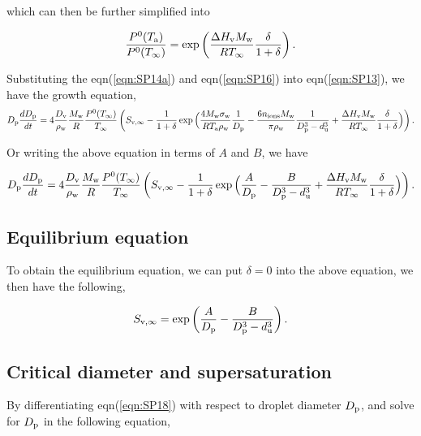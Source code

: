 \documentclass[12pt]{article}
\begin{document}
which can then be further simplified into 

\begin{equation}\label{eqn:SP16}
\frac{P^{\rm 0}(T_{\rm a})}{P^{\rm 0}(T_{\infty})}=\exp \left(\frac{\Delta H_{\rm v} M_{\rm w}}{R T_{\infty}} \frac{\delta}{1+\delta}\right).
\end{equation}

Substituting the eqn(\ref{eqn:SP14a}) and eqn(\ref{eqn:SP16}) into eqn(\ref{eqn:SP13}), we have
the growth equation, 
\begin{equation}\label{eqn:SP17a}
D_{\rm p}\frac{dD_{\rm p}}{dt}=4 \frac{D_{\rm v}} {\rho_{\rm w}} \frac{M_{\rm w}}{R} \frac{P^{\rm 0}(T_{\infty})} {T_{\infty}} \left(S_{\rm v, \infty} - \frac{1}{1+\delta} \exp \Big(\frac{4 M_{\rm w}\sigma_{\rm w}}{R T_{\rm a} \rho_{\rm w}}\frac{1}{D_{\rm p}}-\frac{6 n_{\rm ions} M_{\rm w}}{\pi \rho_{\rm w}} \frac{1}{D_{\rm p}^{3}-d_{\rm u}^{3}}+\frac{\Delta H_{\rm v} M_{\rm w}}{R T_{\infty}} \frac{\delta}{1+\delta}\Big)\right).
\end{equation}

Or writing the above equation in terms of  $A$ and $B$, we have

\begin{equation}\label{eqn:SP17b}
D_{\rm p}\frac{dD_{\rm p}}{dt}=4 \frac{D_{\rm v}} {\rho_{\rm w}} \frac{M_{\rm w}}{R} \frac{P^{\rm 0}(T_{\infty})} {T_{\infty}} \left(S_{\rm v, \infty} - \frac{1}{1+\delta} \exp\Big(\frac{A}{D_{\rm p}}- \frac{B}{D_{\rm p}^{3}-d_{\rm u}^{3}}+\frac{\Delta H_{\rm v} M_{\rm w}}{R T_{\infty}} \frac{\delta}{1+\delta}\Big)\right).
\end{equation}
\subsection{Equilibrium equation}
To obtain the equilibrium equation, we can put $\delta=0$ into the above equation,  we then have the following,

\begin{equation}\label{eqn:SP18}
S_{\rm v, \infty} = \exp\left(\frac{A}{D_{\rm p}}- \frac{B}{D_{\rm p}^{3}-d_{\rm u}^{3}}\right).
\end{equation}


\subsection{Critical diameter and supersaturation} 

By differentiating eqn(\ref{eqn:SP18}) with respect to droplet diameter $D_{\rm p}$, and solve for $D_{\rm p}$ in the following equation,  
\end{document}
